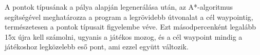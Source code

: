 

A pontok típusának a pálya alapján legenerálása után, az A*-algoritmus segítségével meghatározza a program a legrövidebb útvonalat a cél waypointig, természetesen a pontok típusait figyelembe véve. Ezt másodpercenként legalább 15x újra kell számolni, ugyanis a játékos mozog, és a cél waypoint mindig a játékoshoz legközelebb eső pont, ami ezzel együtt változik.

